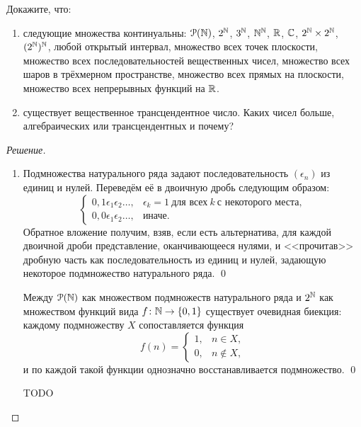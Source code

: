     \begin{problem}[2]
        Докажите, что:
        \begin{enumerate}[label=(\alph{*})]
            \item следующие множества континуальны: \(\operatorname{\mathcal{P}}(\mathbb{N})\), \(2^{\mathbb{N}}\), \(3^{\mathbb{N}}\), \(\mathbb{N}^{\mathbb{N}}\), \(\mathbb{R}\), \(\mathbb{C}\), \(2^{\mathbb{N}} \times 2^{\mathbb{N}}\), \((2^{\mathbb{N}})^{\mathbb{N}}\), любой открытый интервал, множество всех точек плоскости, множество всех последовательностей вещественных чисел, множество всех шаров в трёхмерном пространстве, множество всех прямых на плоскости, множество всех непрерывных функций на \(\mathbb{R}\).
            \item существует вещественное трансцендентное число. Каких чисел больше, алгебраических или трансцендентных и почему?
        \end{enumerate}
    \end{problem}
    \begin{proof}[Решение]
        \begin{enumerate}[label=(\alph{*})]
            \item Подмножества натурального ряда задают последовательность \((\epsilon_n)\) из единиц и нулей. Переведём её в двоичную дробь следующим образом: \[
                \begin{cases}
                    0,1 \epsilon_1 \epsilon_2 \ldots, & \epsilon_k = 1 \ \text{для всех} \ k \ \text{с некоторого места}, \\
                    0,0 \epsilon_1 \epsilon_2 \ldots, & \text{иначе}.
                \end{cases}
            \]
            Обратное вложение получим, взяв, если есть альтернатива, для каждой двоичной дроби представление, оканчивающееся нулями, и <<прочитав>> дробную часть как последовательность из единиц и нулей, задающую некоторое подмножество натурального ряда. \qed

            Между \(\operatorname{\mathcal{P}}(\mathbb{N})\) как множеством подмножеств натурального ряда и \(2^{\mathbb{N}}\) как множеством функций вида \(f \colon \mathbb{N} \to \{0, 1\}\) существует очевидная биекция: каждому подмножеству \(X\) сопоставляется функция \[
                f(n) =
                \begin{cases}
                    1, & n \in X, \\
                    0, & n \not \in X,
                \end{cases}
            \]
            и по каждой такой функции однозначно восстанавливается подмножество. \qed
            
            TODO

        \end{enumerate}
    \end{proof}

